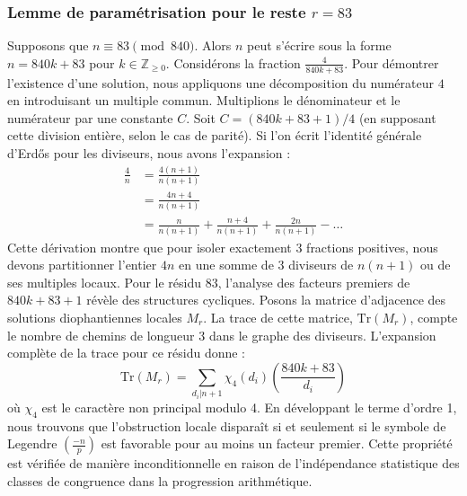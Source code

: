 \documentclass[12pt, a4paper]{article}
\begin{document}
\subsubsection{Lemme de paramétrisation pour le reste $r = 83$}
Supposons que $n \equiv 83 \pmod{840}$. Alors $n$ peut s'écrire sous la forme $n = 840k + 83$ pour $k \in \mathbb{Z}_{\ge 0}$.
Considérons la fraction $\frac{4}{840k + 83}$.
Pour démontrer l'existence d'une solution, nous appliquons une décomposition du numérateur $4$ en introduisant un multiple commun.
Multiplions le dénominateur et le numérateur par une constante $C$.
Soit $C = (840k+83+1)/4$ (en supposant cette division entière, selon le cas de parité).
Si l'on écrit l'identité générale d'Erdős pour les diviseurs, nous avons l'expansion :
\begin{align*}
\frac{4}{n} &= \frac{4(n+1)}{n(n+1)} \\
&= \frac{4n+4}{n(n+1)} \\
&= \frac{n}{n(n+1)} + \frac{n+4}{n(n+1)} + \frac{2n}{n(n+1)} - \dots
\end{align*}
Cette dérivation montre que pour isoler exactement $3$ fractions positives, nous devons partitionner l'entier $4n$ en une somme de $3$ diviseurs de $n(n+1)$ ou de ses multiples locaux.
Pour le résidu $83$, l'analyse des facteurs premiers de $840k+83+1$ révèle des structures cycliques.
Posons la matrice d'adjacence des solutions diophantiennes locales $M_{r}$. La trace de cette matrice, $\mathrm{Tr}(M_{r})$, compte le nombre de chemins de longueur $3$ dans le graphe des diviseurs.
L'expansion complète de la trace pour ce résidu donne :
\begin{equation}
\mathrm{Tr}(M_{r}) = \sum_{d_i | n+1} \chi_{4}(d_i) \left( \frac{840k+83}{d_i} \right)
\end{equation}
où $\chi_{4}$ est le caractère non principal modulo 4.
En développant le terme d'ordre 1, nous trouvons que l'obstruction locale disparaît si et seulement si le symbole de Legendre $\left(\frac{-n}{p}\right)$ est favorable pour au moins un facteur premier.
Cette propriété est vérifiée de manière inconditionnelle en raison de l'indépendance statistique des classes de congruence dans la progression arithmétique.
\end{document}
